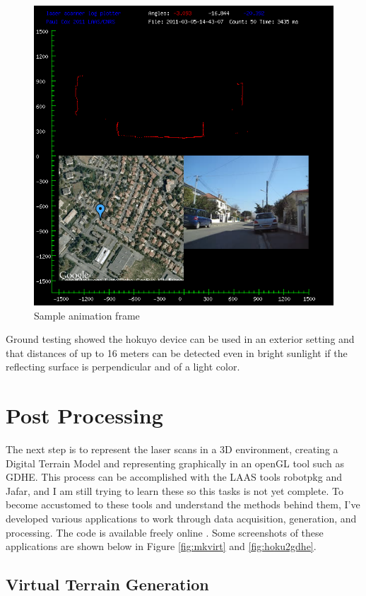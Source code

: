 \documentclass[a4paper,11pt]{report}
\begin{document}
\begin{figure}[ht]
 \centering
 \includegraphics[width=12cm]{./Plotlogsample.png}
 \caption{Sample animation frame}
 \label{fig:plotlogsample}
\end{figure}

Ground testing showed the hokuyo device can be used in an exterior setting and that distances of up to 16 meters can be detected even in bright sunlight if the reflecting surface is perpendicular and of a light color.

\section{Post Processing}

The next step is to represent the laser scans in a 3D environment, creating a Digital Terrain Model and representing graphically in an openGL tool such as GDHE. This process can be accomplished with the LAAS tools robotpkg and Jafar, and I am still trying to learn these so this tasks is not yet complete. To become accustomed to these tools and understand the methods behind them, I've developed various applications to work through data acquisition, generation, and processing. The code is available freely online \cite{laserhawkgit}. Some screenshots of these applications are shown below in Figure \ref{fig:mkvirt} and \ref{fig:hoku2gdhe}.

\subsection{Virtual Terrain Generation}
\end{document}
